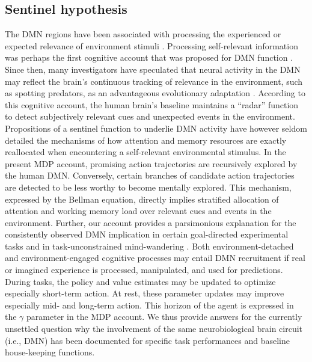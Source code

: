 \documentclass[10pt,letterpaper]{article}
\begin{document}
\subsection{Sentinel hypothesis}
The DMN regions have been associated with processing the
experienced or expected relevance of environment stimuli
\citep{montague2006imaging}.
Processing self-relevant information was perhaps the first
cognitive account that was proposed for DMN function
\citep{gusnard2001medial, raichle2001pnas}.
Since then,
many investigators have speculated that neural activity in the DMN
may reflect the brain's continuous tracking of
relevance in the environment, such as spotting predators,
as an advantageous evolutionary adaptation \citep{randy2008, hahn2007cingulate}.
According to this cognitive account, the human brain's baseline maintains
a ``radar'' function to
detect subjectively relevant cues and unexpected events in the environment.
Propositions of a sentinel function to underlie DMN activity
have however seldom detailed
the mechanisms of
how attention and memory resources are exactly reallocated when
encountering a self-relevant environmental stimulus.
In the present MDP account,
promising action trajectories
are recursively explored by the human DMN. Conversely,
certain branches of candidate action trajectories
are detected to be less worthy to become mentally explored.
This mechanism, expressed by the Bellman equation,
directly implies stratified allocation of attention and working memory load
over relevant cues and events in the environment.
%
Further,
our account provides a parsimonious explanation for
the consistently observed DMN implication
in certain goal-directed experimental tasks and
in task-unconstrained mind-wandering \citep{smith2009, bzdok2016formal}.
Both environment-detached and environment-engaged
cognitive processes may entail DMN recruitment
if real or imagined experience is processed, manipulated, and
used for predictions.
During tasks,
the policy and value estimates may be
updated to optimize especially short-term action.
At rest, these parameter updates may
improve especially mid- and long-term action.
This horizon of the agent
is expressed in the $\gamma$ parameter in the MDP account.
We thus provide answers for the currently unsettled question why the involvement
of the same neurobiological brain circuit (i.e., DMN) has been documented
for specific task performances and baseline house-keeping functions.
\end{document}
